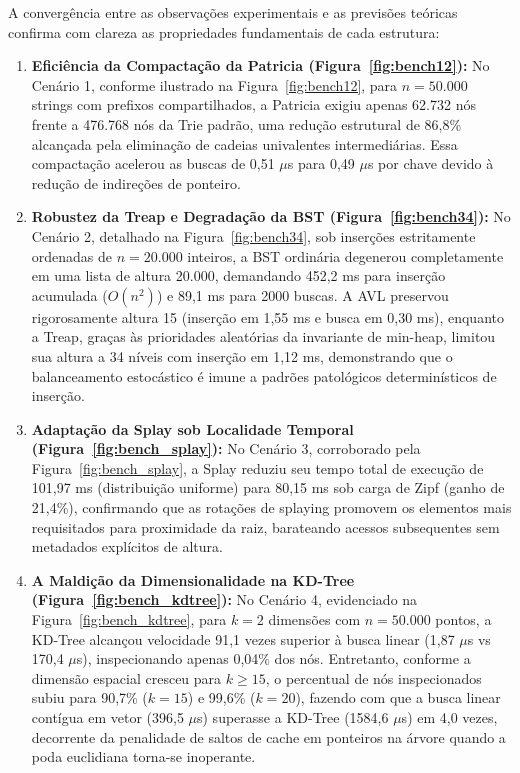 \documentclass[11pt,a4paper]{article}
\newcommand{\Ogrande}[1]{\ensuremath{O\!\left(#1\right)}}
\begin{document}
A convergência entre as observações experimentais e as previsões teóricas confirma com clareza as propriedades fundamentais de cada estrutura:
\begin{enumerate}[leftmargin=*]
  \item \textbf{Eficiência da Compactação da Patricia (Figura~\ref{fig:bench12}):} No Cenário 1, conforme ilustrado na Figura~\ref{fig:bench12}, para $n=50.000$ strings com prefixos compartilhados, a Patricia exigiu apenas 62.732 nós frente a 476.768 nós da Trie padrão, uma redução estrutural de 86,8\% alcançada pela eliminação de cadeias univalentes intermediárias. Essa compactação acelerou as buscas de 0,51 $\mu$s para 0,49 $\mu$s por chave devido à redução de indireções de ponteiro.
  \item \textbf{Robustez da Treap e Degradação da BST (Figura~\ref{fig:bench34}):} No Cenário 2, detalhado na Figura~\ref{fig:bench34}, sob inserções estritamente ordenadas de $n=20.000$ inteiros, a BST ordinária degenerou completamente em uma lista de altura 20.000, demandando 452,2 ms para inserção acumulada ($\Ogrande{n^2}$) e 89,1 ms para 2000 buscas. A AVL preservou rigorosamente altura 15 (inserção em 1,55 ms e busca em 0,30 ms), enquanto a Treap, graças às prioridades aleatórias da invariante de min-heap, limitou sua altura a 34 níveis com inserção em 1,12 ms, demonstrando que o balanceamento estocástico é imune a padrões patológicos determinísticos de inserção.
  \item \textbf{Adaptação da Splay sob Localidade Temporal (Figura~\ref{fig:bench_splay}):} No Cenário 3, corroborado pela Figura~\ref{fig:bench_splay}, a Splay reduziu seu tempo total de execução de 101,97 ms (distribuição uniforme) para 80,15 ms sob carga de Zipf (ganho de 21,4\%), confirmando que as rotações de splaying promovem os elementos mais requisitados para proximidade da raiz, barateando acessos subsequentes sem metadados explícitos de altura.
  \item \textbf{A Maldição da Dimensionalidade na KD-Tree (Figura~\ref{fig:bench_kdtree}):} No Cenário 4, evidenciado na Figura~\ref{fig:bench_kdtree}, para $k=2$ dimensões com $n=50.000$ pontos, a KD-Tree alcançou velocidade 91,1 vezes superior à busca linear (1,87 $\mu$s vs 170,4 $\mu$s), inspecionando apenas 0,04\% dos nós. Entretanto, conforme a dimensão espacial cresceu para $k \ge 15$, o percentual de nós inspecionados subiu para 90,7\% ($k=15$) e 99,6\% ($k=20$), fazendo com que a busca linear contígua em vetor (396,5 $\mu$s) superasse a KD-Tree (1584,6 $\mu$s) em 4,0 vezes, decorrente da penalidade de saltos de cache em ponteiros na árvore quando a poda euclidiana torna-se inoperante.
\end{enumerate}
\end{document}
